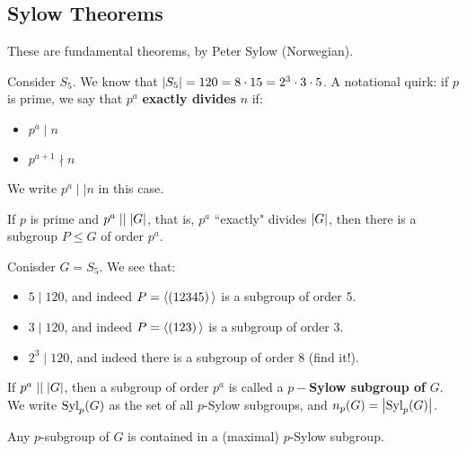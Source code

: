 \subsection{Sylow Theorems}


These are fundamental theorems, by Peter Sylow (Norwegian).

Consider $ S_{5} $. We know that $ \abs{S_{5}} = 120 = 8 \cdot 15 = 2^{3} \cdot 3 \cdot 5 $. \vsp
%
A notational quirk: if $ p $ is prime, we say that $ p^{a} $ \textbf{exactly divides} $ n $ if:
\begin{itemize}
    \item $ p^{a} \mid n $
    \item $ p^{a+1} \nmid n $
\end{itemize}
We write $ p^{a} \mid\mid n $ in this case.

\begin{thm}[title=First Sylow Theorem]
    If $ p $ is prime and $ p^{a} \mid\mid \abs{G} $,
    that is, $ p^{a} $ ``exactly" divides $ \abs{G} $,
    then there is a subgroup $ P \leq G $ of order $ p^{a} $.
\end{thm}

\begin{xmp}[source=Primary Source Material]
    Conisder $ G = S_{5} $. We see that:
    \begin{itemize}
        \item $ 5 \mid 120 $, and indeed $ P = \operatorname{\langle} (12345) \operatorname{\rangle} $ is a subgroup of order $ 5 $.
        \item $ 3 \mid 120 $, and indeed $ P = \operatorname{\langle} (123) \operatorname{\rangle} $ is a subgroup of order $ 3 $.
        \item $ 2^{3} \mid 120 $, and indeed there is a subgroup of order $ 8 $ (find it!).
    \end{itemize}
\end{xmp}

\begin{defn}
    If $ p^{a} \mid\mid \abs{G} $, then a subgroup of order $ p^{a} $ is called
    a $ p- $\textbf{Sylow subgroup of} $ G $. \vsp
    We write $ \textrm{Syl}_{p}(G) $ as the set of all $ p $-Sylow subgroups, and
    $ n_{p}(G) = \abs{\textrm{Syl}_{p}(G)} $.
\end{defn}

\begin{thm}[title=Second(?) Sylow Theorem]
    Any $ p $-subgroup of $ G $ is contained in a (maximal) $ p $-Sylow subgroup.
\end{thm}

